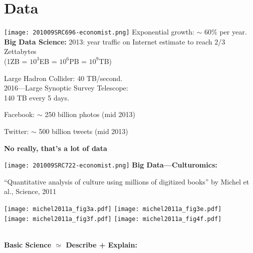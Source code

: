 \section{Data}

  
  
    
    \texttt{[image: 201009SRC696-economist.png]}
      Exponential growth: $\sim$ 60\% per year.
    \textbf{Big Data Science:}
      2013: year traffic on Internet estimate to reach 2/3 Zettabytes \\
      (1ZB = $10^3$EB = $10^6$PB = $10^9$TB)
     
      Large Hadron Collider: 40 TB/second.\\
     
      2016---Large Synoptic Survey Telescope:\\
      140 TB every 5 days.
     
      Facebook: $\sim$ 250 billion photos (mid 2013)
     
      Twitter: $\sim$ 500 billion tweets (mid 2013)
  
  \textbf{No really, that's a lot of data}

  \texttt{[image: 201009SRC722-economist.png]}
  \textbf{Big Data---Culturomics:}

  \small{``Quantitative analysis of culture using millions of
    digitized books'' by Michel et al., Science, 2011\cite{michel2011a}}

  \texttt{[image: michel2011a\_fig3a.pdf]} 
  \texttt{[image: michel2011a\_fig3e.pdf]} \\
  \texttt{[image: michel2011a\_fig3f.pdf]}
  \texttt{[image: michel2011a\_fig4f.pdf]}

  {\small
    \\
  }
  \textbf{Basic Science $\simeq$ Describe + Explain:}
    
